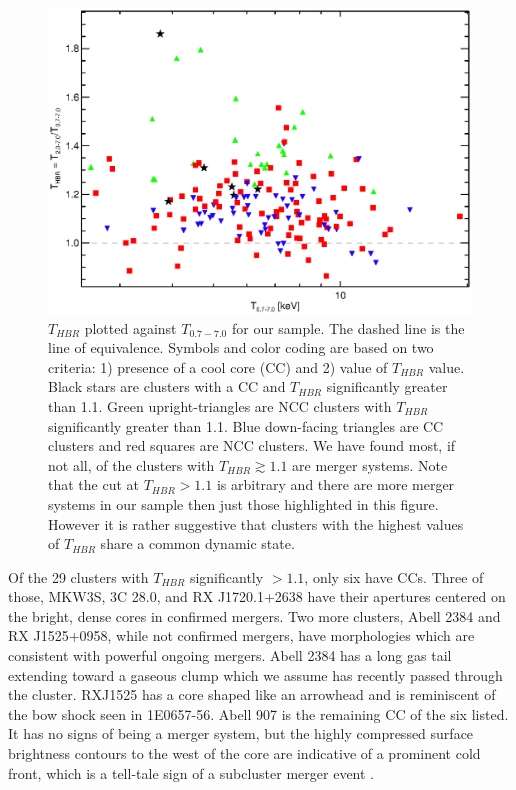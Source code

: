 \documentclass[12pt,preprint]{aastex}
\begin{document}
\clearpage
\begin{figure}
\begin{center}
\includegraphics*[width=\textwidth, trim=5mm 0mm 0mm 0mm, clip]{f6.eps}
\caption{
$T_{HBR}$ plotted against $T_{0.7-7.0}$ for our sample. The dashed line
is the line of equivalence. Symbols and color coding are based on two
criteria: 1) presence of a cool core
(CC) and 2) value of $T_{HBR}$ value. Black stars are clusters with a
CC and $T_{HBR}$ significantly greater than 1.1. Green
upright-triangles are NCC clusters with $T_{HBR}$ significantly
greater than 1.1. Blue down-facing triangles are CC clusters and red
squares are NCC clusters. We have found most, if not all, of the
clusters with $T_{HBR} \gtrsim 1.1$ are merger systems. Note that the
cut at $T_{HBR} > 1.1$ is arbitrary and there are more merger systems
in our sample then just those highlighted in this figure. However it
is rather suggestive that clusters with the highest values of $T_{HBR}$
share a common dynamic state.
}
\label{fig:ftx_tx}
\end{center}
\end{figure}
\clearpage

Of the 29 clusters with $T_{HBR}$ significantly $> 1.1$, only six have
CCs. Three of those, MKW3S, 3C 28.0, and RX J1720.1+2638 have their
apertures centered on the bright, dense cores in confirmed
mergers. Two more clusters, Abell 2384 and RX J1525+0958, while
not confirmed mergers, have morphologies which are consistent with
powerful ongoing mergers. Abell 2384 has a long gas tail extending toward
a gaseous clump which we assume has recently passed through the cluster.
RXJ1525 has a core shaped like an arrowhead and is reminiscent of the
bow shock seen in 1E0657-56. Abell 907 is the remaining CC of the six
listed. It has no signs of being a merger system, but the highly
compressed surface brightness contours to the west of the core are
indicative of a prominent cold front, which is a tell-tale sign of a
subcluster merger event \citep{2007PhR...443....1M}.
\end{document}
